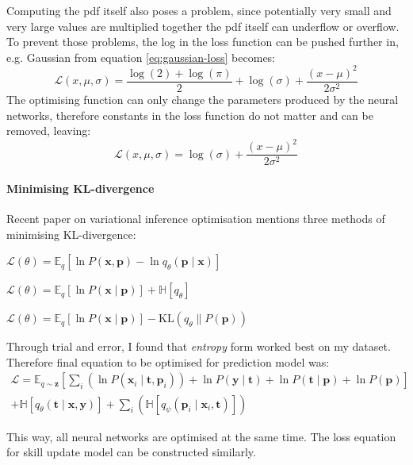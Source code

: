 \documentclass[12pt,a4paper]{book}
\newcommand\bs[1]{\boldsymbol{#1}}
\begin{document}
Computing the pdf itself also poses a problem, since potentially very small and very large values are multiplied together the pdf itself can underflow or overflow.
To prevent those problems, the log in the loss function can be pushed further in, e.g. Gaussian from equation \ref{eq:gaussian-loss} becomes:
\begin{equation*}
\mathcal{L}(x,\mu,\sigma) = \frac{\log(2)+\log(\pi)}{2}+\log(\sigma)+\frac{(x-\mu)^2}{2\sigma^2}
\end{equation*}
The optimising function can only change the parameters produced by the neural networks, therefore constants in the loss function do not matter and can be removed, leaving:
\begin{equation}
\mathcal{L}(x,\mu,\sigma) = \log(\sigma)+\frac{(x-\mu)^2}{2\sigma^2}
\label{eq:gaussian-log-loss}
\end{equation}

\paragraph{Minimising KL-divergence}
Recent paper on variational inference optimisation \cite{variationalmethods} mentions three methods of minimising KL-divergence:
\begin{description}[labelwidth=\widthof{\bfseries Entropy form }]
\item[Full MC form] $\mathcal{L}(\theta) = \mathbb{E}_{q}[\ln P(\bs{x},\bs{p}) - \ln q_\theta(\bs{p}\mid\bs{x})]$
\item[Entropy form] $\mathcal{L}(\theta) = \mathbb{E}_{q}[\ln P(\bs{x}\mid\bs{p})] + \mathbb{H}[q_\theta]$
\item[KL form] $\mathcal{L}(\theta) = \mathbb{E}_{q}[\ln P(\bs{x}\mid\bs{p})] - \text{KL}(q_\theta \parallel P(\bs{p}))$
\end{description}
Through trial and error, I found that \emph{entropy} form worked best on my dataset.
Therefore final equation to be optimised for prediction model was:
\begin{multline*}
\mathcal{L} = \mathbb{E}_{q\sim\bs{z}}\left[\sum_i(\ln P(\bs{x}_i\mid\bs{t},\bs{p}_i))+\ln P(\bs{y}\mid\bs{t})+\ln P(\bs{t}\mid\bs{p})+\ln P(\bs{p})\right] \\
+\mathbb{H}[q_\theta(\bs{t}\mid\bs{x},\bs{y})] + \sum_i\left(\mathbb{H}[q_\psi(\bs{p}_i\mid\bs{x}_i,\bs{t})]\right)
\end{multline*}

This way, all neural networks are optimised at the same time.
The loss equation for skill update model can be constructed similarly.
\end{document}
